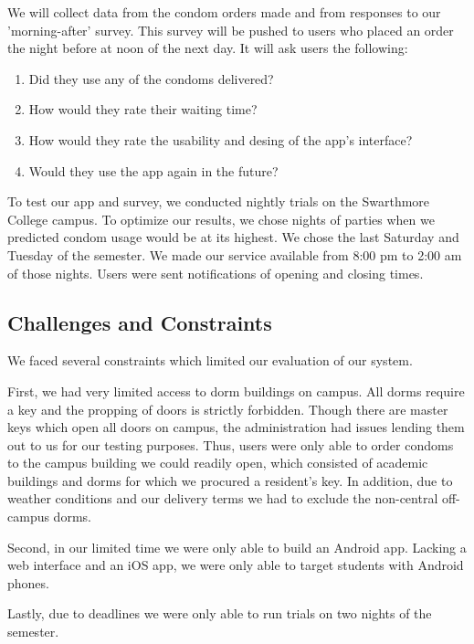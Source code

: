 \documentclass{acm_proc_article-sp}
\begin{document}
We will collect data from the condom orders made and from responses to our 'morning-after' survey. This survey will be pushed to users who placed an order the night before at noon of the next day. It will ask users the following:
\begin{enumerate}
\item Did they use any of the condoms delivered?
\item How would they rate their waiting time?
\item How would they rate the usability and desing of the app's interface?
\item Would they use the app again in the future?
\end{enumerate}

To test our app and survey, we conducted nightly trials on the Swarthmore College campus. To optimize our results, we chose nights of parties when we predicted condom usage would be at its highest. We chose the last Saturday and Tuesday of the semester. We made our service available from 8:00 pm to 2:00 am of those nights. Users were sent notifications of opening and closing times. 

\subsection{Challenges and Constraints}
\smallskip
We faced several constraints which limited our evaluation of our system. 

First, we had very limited access to dorm buildings on campus. All dorms require a key and the propping of doors is strictly forbidden. Though there are master keys which open all doors on campus, the administration had issues lending them out to us for our testing purposes. Thus, users were only able to order condoms to the campus building we could readily open, which consisted of academic buildings and dorms for which we procured a resident’s key. In addition, due to weather conditions and our delivery terms we had to exclude the non-central off-campus dorms. 

Second, in our limited time we were only able to build an Android app. Lacking a web interface and an iOS app, we were only able to target students with Android phones. 

Lastly, due to deadlines we were only able to run trials on two nights of the semester. 
\end{document}
